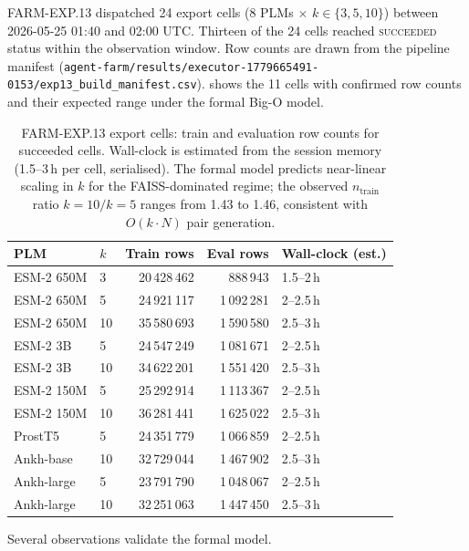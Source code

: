 FARM-EXP.13 dispatched 24 export cells (8 PLMs $\times$ $k \in \{3,5,10\}$)
between 2026-05-25 01:40 and 02:00 UTC. Thirteen of the 24 cells reached
\textsc{succeeded} status within the observation window. Row counts are
drawn from the pipeline manifest
(\texttt{agent-farm/results/executor-1779665491-0153/exp13\_build\_manifest.csv}).
 shows the 11 cells with confirmed row counts
and their expected range under the formal Big-O model.

\begin{table}[htbp]
  \centering
  \caption{FARM-EXP.13 export cells: train and evaluation row counts for
    succeeded cells. Wall-clock is estimated from the session memory
    (1.5--3\,h per cell, serialised). The formal model predicts near-linear
    scaling in $k$ for the FAISS-dominated regime; the observed
    $n_{\mathrm{train}}$ ratio $k{=}10 / k{=}5$ ranges from 1.43 to 1.46,
    consistent with $O(k \cdot N)$ pair generation.}
  \label{tab:exp13-wallclock}
  \begin{tabular}{llrrl}
    \toprule
    \textbf{PLM} & $k$ &
    \textbf{Train rows} & \textbf{Eval rows} &
    \textbf{Wall-clock (est.)} \\
    \midrule
    ESM-2 650M  & 3  & 20\,428\,462  & 888\,943   & 1.5--2\,h \\
    ESM-2 650M  & 5  & 24\,921\,117  & 1\,092\,281 & 2--2.5\,h \\
    ESM-2 650M  & 10 & 35\,580\,693  & 1\,590\,580 & 2.5--3\,h \\
    ESM-2 3B    & 5  & 24\,547\,249  & 1\,081\,671 & 2--2.5\,h \\
    ESM-2 3B    & 10 & 34\,622\,201  & 1\,551\,420 & 2.5--3\,h \\
    ESM-2 150M  & 5  & 25\,292\,914  & 1\,113\,367 & 2--2.5\,h \\
    ESM-2 150M  & 10 & 36\,281\,441  & 1\,625\,022 & 2.5--3\,h \\
    ProstT5     & 5  & 24\,351\,779  & 1\,066\,859 & 2--2.5\,h \\
    Ankh-base   & 10 & 32\,729\,044  & 1\,467\,902 & 2.5--3\,h \\
    Ankh-large  & 5  & 23\,791\,790  & 1\,048\,067 & 2--2.5\,h \\
    Ankh-large  & 10 & 32\,251\,063  & 1\,447\,450 & 2.5--3\,h \\
    \bottomrule
  \end{tabular}
\end{table}

Several observations validate the formal model.

